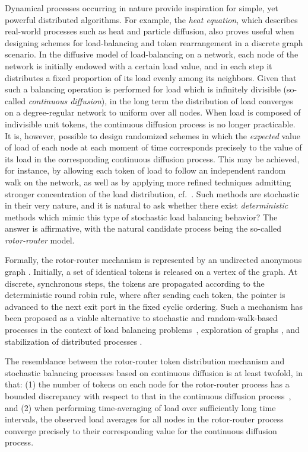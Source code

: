 \documentclass{article}[11pt,letter]
\begin{document}
Dynamical processes occurring in nature provide inspiration for simple, yet powerful distributed algorithms. For example, the \emph{heat equation}, which describes real-world processes such as heat and particle diffusion, also proves useful when designing schemes for load-balancing and token rearrangement in a discrete graph scenario. In the diffusive model of load-balancing on a network, each node of the network is initially endowed with a certain load value, and in each step it distributes a fixed proportion of its load evenly among its neighbors. Given that such a balancing operation is performed for load which is infinitely divisible (so-called \emph{continuous diffusion}), in the long term the distribution of load converges on a degree-regular network to uniform over all nodes. When load is composed of indivisible unit tokens, the continuous diffusion process is no longer practicable. It is, however, possible to design randomized schemes in which the \emph{expected} value of load of each node at each moment of time corresponds precisely to the value of its load in the corresponding continuous diffusion process. This may be achieved, for instance, by allowing each token of load to follow an independent random walk on the network, as well as by applying more refined techniques admitting stronger concentration of the load distribution, cf.~\cite{DBLP:conf/focs/SauerwaldS12}. Such methods are stochastic in their very nature, and it is natural to ask whether there exist \emph{deterministic} methods which mimic this type of stochastic load balancing behavior? The answer is affirmative, with the natural candidate process being the so-called \emph{rotor-router} model.

Formally, the rotor-router mechanism is represented by an undirected anonymous graph . Initially, a set of identical tokens is released on a vertex of the graph. At discrete, synchronous steps, the tokens are propagated according to the deterministic round robin rule, where after sending each token, the pointer is advanced to the next exit port in the fixed cyclic ordering. Such a mechanism has been proposed as a viable alternative to stochastic and random-walk-based processes in the context of load balancing problems~\cite{BerenbrinkKKMU14,DBLP:journals/cpc/CooperS06,DBLP:journals/cpc/DoerrF09}, exploration of graphs \cite{DBLP:journals/siamcomp/AfekG94,DereniowskiKPU14,Frae70,GR,KosowskiP14}, and stabilization of distributed processes \cite{BHKKR09,BhattEGT02,PhysRevLett.77.5079,YanovskiWB03}.

The resemblance between the rotor-router token distribution mechanism and stochastic balancing processes based on continuous diffusion is at least twofold, in that: (1) the number of tokens on each node for the rotor-router process has a bounded discrepancy with respect to that in the continuous diffusion process~\cite{DBLP:journals/corr/BerenbrinkKKMU14,DBLP:conf/cocoon/ShiragaYKY14}, and (2) when performing time-averaging of load over sufficiently long time intervals, the observed load averages for all nodes in the rotor-router process converge precisely to their corresponding value for the continuous diffusion process.
\end{document}
